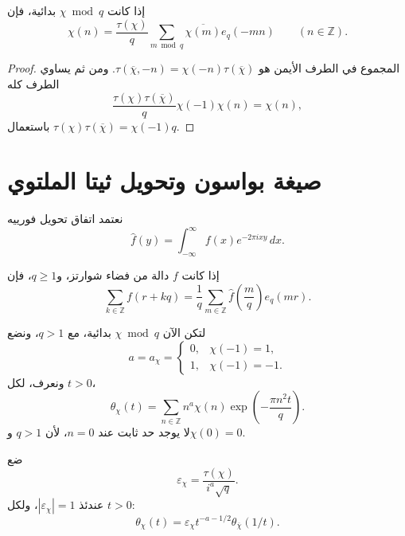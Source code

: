 \begin{corollary}
\label{cor:finite-fourier-character}
\provedhere
إذا كانت \(\chi\bmod q\) بدائية، فإن
\[
\chi(n)
=
\frac{\tau(\chi)}{q}
\sum_{m\bmod q}\overline{\chi(m)}e_q(-mn)
\qquad(n\in\mathbb Z).
\]
\end{corollary}

\begin{proof}
المجموع في الطرف الأيمن هو
\(\tau(\overline\chi,-n)=\chi(-n)\tau(\overline\chi)\). ومن ثم يساوي
الطرف كله
\[
\frac{\tau(\chi)\tau(\overline\chi)}q
\chi(-1)\chi(n)=\chi(n),
\]
باستعمال \(\tau(\chi)\tau(\overline\chi)=\chi(-1)q\).
\end{proof}

\section{صيغة بواسون وتحويل ثيتا الملتوي}

نعتمد اتفاق تحويل فورييه
\[
\widehat f(y)=\int_{-\infty}^{\infty}f(x)e^{-2\pi ixy}\,dx.
\]

\begin{theorem}
\label{thm:poisson-residue-class}
إذا كانت \(f\) دالة من فضاء شوارتز، و\(q\geq1\)، فإن
\[
\sum_{k\in\mathbb Z}f(r+kq)
=
\frac1q\sum_{m\in\mathbb Z}
\widehat f\!\left(\frac mq\right)e_q(mr).
\]
\end{theorem}

لتكن الآن \(\chi\bmod q\) بدائية، مع \(q>1\)، ونضع
\[
a=a_\chi=
\begin{cases}
0,&\chi(-1)=1,\\
1,&\chi(-1)=-1.
\end{cases}
\]
ونعرف، لكل \(t>0\)،
\[
\theta_\chi(t)
=
\sum_{n\in\mathbb Z}n^a\chi(n)
\exp\!\left(-\frac{\pi n^2t}{q}\right).
\]
لا يوجد حد ثابت عند \(n=0\)، لأن \(q>1\) و\(\chi(0)=0\).

\begin{theorem}
\label{thm:twisted-theta-transformation}
\provedhere
ضع
\[
\varepsilon_\chi
=
\frac{\tau(\chi)}{i^a\sqrt q}.
\]
عندئذ \(|\varepsilon_\chi|=1\)، ولكل \(t>0\):
\[
\theta_\chi(t)
=
\varepsilon_\chi
t^{-a-1/2}
\theta_{\overline\chi}(1/t).
\]
\end{theorem}

